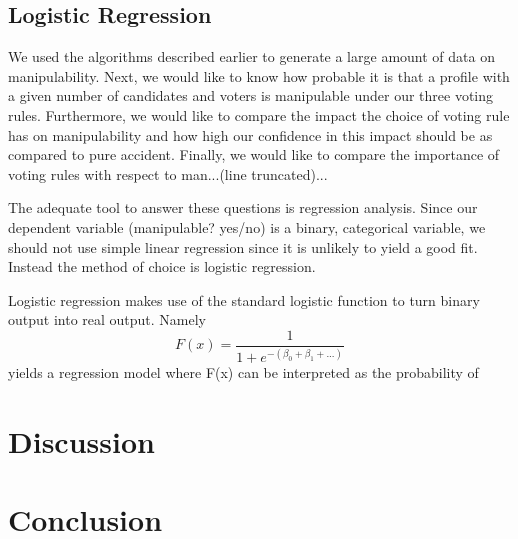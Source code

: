 \documentclass[10pt,a4paper]{article}
\begin{document}
\subsection{Logistic Regression}
We used the algorithms described earlier to generate a large amount of data on manipulability. Next, we would like to know how probable it is that a profile with a given number of candidates and voters is manipulable under our three voting rules. Furthermore, we would like to compare the impact the choice of voting rule has on manipulability and how high our confidence in this impact should be as compared to pure accident. Finally, we would like to compare the importance of voting rules with respect to man...(line truncated)...

The adequate tool to answer these questions is regression analysis. Since our dependent variable (manipulable? yes/no) is a binary, categorical variable, we should not use simple linear regression since it is unlikely to yield a good fit. Instead the method of choice is logistic regression.

Logistic regression makes use of the standard logistic function to turn binary output into real output. Namely \[F(x)=\frac{1}{1+e^{-(\beta_0+\beta_1+...)}}\] yields a regression model where F(x) can be interpreted as the probability of
\section{Discussion}
\section{Conclusion}
\end{document}
